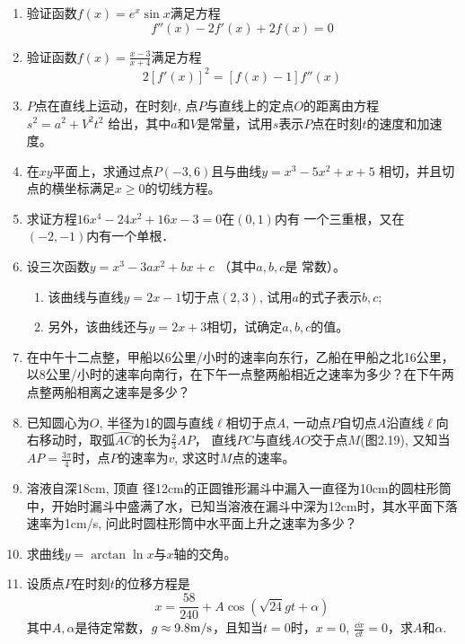 \begin{enumerate}
\item 验证函数$f(x)=e^x \sin x$满足方程
\[f'' (x) -2f' (x) +2f (x) =0\]
\item 验证函数$f(x)=\frac{x-3}{x+4}$满足方程
\[2 [f' (x) ]^2= [f (x) -1] f'' (x) \]
\item $P$点在直线上运动，在时刻$t$, 点$P$与直线上的定点$O$的距离由方程
$s^2=a^2+V^2t^2$
给出，其中$a$和$V$是常量，试用$s$表示$P$点在时刻$t$的速度和加速度。
\item 在$xy$平面上，求通过点$P(-3, 6)$且与曲线$y=x^3-5x^2+x+5$
相切，并且切点的横坐标满足$x\ge 0$的切线方程。
\item 求证方程$16x^4-24x^2+16x-3=0$在$(0, 1)$内有
一个三重根，又在$(-2,-1)$内有一个单根．
\item 设三次函数$y=x^3-3ax^2+bx+c$ （其中$a,b,c$是
常数）。
\begin{enumerate}
    \item 该曲线与直线$y=2x-1$切于点$(2, 3)$, 试用$a$的式子表示$b,c$;
    \item 另外，该曲线还与$y=2x+3$相切，试确定$a,b,c$的值。
\end{enumerate}
\item 在中午十二点整，甲船以6公里/小时的速率向东行，乙船在甲船之北16公里，以8公里/小时的速率向南行，在下午一点整两船相近之速率为多少？在下午两点整两船相离之速率是多少？
\item 已知圆心为$O$, 半径为1的圆与直线$\ell$相切于点$A$, 一动点$P$自切点$A$沿直线$\ell$向右移动时，取弧$\wideparen{AC}$的长为$\frac{2}{3}AP$，
直线$PC$与直线$AO$交于点$M$(图2.19), 又知当$AP=\frac{3\pi}{4}$时，点$P$的速率为$v$, 求这时$M$点的速率。
\begin{figure}[htp]
    \centering
{}    
    \caption{}
\end{figure}

\item 溶液自深18cm, 顶直
径12cm的正圆锥形漏斗中漏入一直径为10cm的圆柱形筒中，开始时漏斗中盛满了水，已知当溶液在漏斗中深为12cm时，其水平面下落速率为1cm/s, 问此时圆柱形筒中水平面上升之速率为多少？
\item 求曲线$y=\arctan\ln x$与$x$轴的交角。
\item 设质点$P$在时刻$t$的位移方程是
\[x=\frac{58}{240}+A\cos\left(\sqrt{24}gt+\alpha\right)\]
其中$A,\alpha$是待定常数，$g\approx 9.8{\rm m/s}$，且知当$t=0$时，$x=0$, $\frac{\dd x}{\dd t}=0$，求$A$和$\alpha$.



\end{enumerate}
